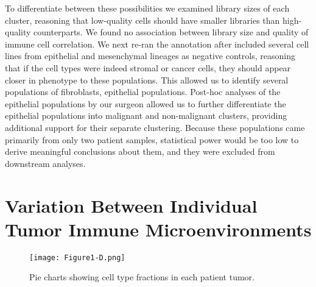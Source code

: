 To differentiate between these possibilities we examined library sizes of each cluster, reasoning that low-quality cells should have smaller libraries than high-quality counterparts. 
We found no association between library size and quality of immune cell correlation. 
We next re-ran the annotation after included several cell lines from epithelial and mesenchymal lineages as negative controls, reasoning that if the cell types were indeed stromal or cancer cells, they should appear closer in phenotype to these populations. 
This allowed us to identify several populations of fibroblasts, epithelial populations.
Post-hoc analyses of the epithelial populations by our surgeon allowed us to further differentiate the epithelial populations into malignant and non-malignant clusters, providing additional support for their separate clustering. %
Because these populations came primarily from only two patient samples, statistical power would be too low to derive meaningful conclusions about them, and they were excluded from downstream analyses. 

\section{Variation Between Individual Tumor Immune Microenvironments}

\begin{figure}
\centering
\texttt{[image: Figure1-D.png]}
\caption{Pie charts showing cell type fractions in each patient tumor. 
}
\label{fig:1d}
\end{figure}

